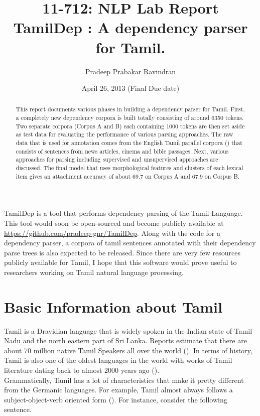 \documentclass[11pt,letterpaper]{article}
\title{11-712:  NLP Lab Report \\ TamilDep : A dependency parser for Tamil.}
\author{Pradeep Prabakar Ravindran}
\date{April 26, 2013 (Final Due date)}
\newcommand{\nascomment}[1]{\textcolor{blue}{\textbf{[#1 --NAS]}}}
\begin{document}
\maketitle
\begin{abstract}
This report documents various phases in building a dependency parser for Tamil. First, a completely new dependency corpora is built totally consisting of
around 6350 tokens. Two separate corpora (Corpus A and B) each containing 1000 tokens are then set aside as test data for evaluating the performance
of various parsing approaches. The raw data that is used for annotation comes from the English Tamil parallel corpora (\cite{RaBoMorphologicalProcessing2012}) that consists of sentences from news articles, cinema and bible passages. 
Next, various approaches for parsing including supervised and unsupervised approaches are discussed. 
The final model that uses morphological features and clusters of each lexical item gives an attachment accuracy of about 69.7 on Corpus A and 67.9 on Corpus B. 

\end{abstract}

TamilDep is a tool that performs dependency parsing of the Tamil Language. This tool would soon be open-sourced
and become publicly available at \url{https://github.com/pradeep-gnr/TamilDep}. Along with
the code for a dependency parser, a corpora of tamil sentences annotated with their dependency parse trees 
is also expected to be released. Since there are very
few resources publicly available for Tamil,  I hope that this software would prove useful to researchers working on Tamil natural
language processing.

\section{Basic Information about Tamil}

Tamil is a Dravidian language that is widely spoken in the Indian state of Tamil Nadu
and the north eastern part of Sri Lanka. Reports estimate that there are about
70 million native Tamil Speakers all over the world (\cite{Wiki}). In terms of history, Tamil is also one of the oldest languages in the world with works of Tamil
literature dating back to almost 2000 years ago (\cite{Wiki}).\\

Grammatically, Tamil has a lot of characteristics that make it pretty different
from the Germanic languages. For example, Tamil almost always follows a subject-object-verb
oriented form (\cite{ramasamy2011tamil}). For instance, consider the following sentence.
\end{document}
